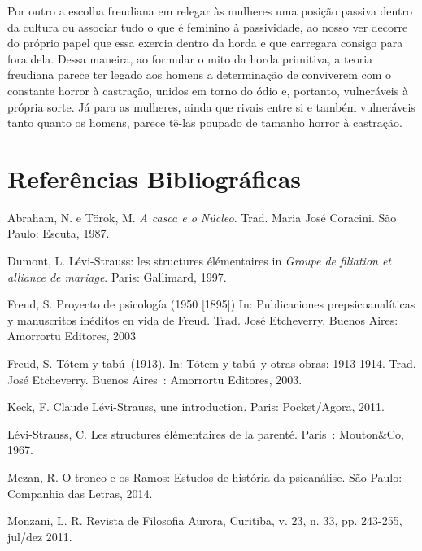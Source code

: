 Por outro a escolha freudiana em relegar às mulheres uma posição passiva
dentro da cultura ou associar tudo o que é feminino à passividade, ao
nosso ver decorre do próprio papel que essa exercia dentro da horda e
que carregara consigo para fora dela. Dessa maneira, ao formular o mito
da horda primitiva, a teoria freudiana parece ter legado aos homens a
determinação de conviverem com o constante horror à castração, unidos em
torno do ódio e, portanto, vulneráveis à própria sorte. Já para as
mulheres, ainda que rivais entre si e também vulneráveis tanto quanto os
homens, parece tê-las poupado de tamanho horror à castração.

\section{Referências Bibliográficas}

Abraham, N. e Törok, M. \emph{A casca e o Núcleo}. Trad. Maria José
Coracini. São Paulo: Escuta, 1987.

Dumont, L. Lévi-Strauss: les structures élémentaires in \emph{Groupe de
filiation et alliance de mariage}. Paris: Gallimard, 1997.

Freud, S. Proyecto de psicología (1950 {[}1895{]}) In: Publicaciones
prepsicoanalíticas y manuscritos inéditos en vida de Freud. Trad. José
Etcheverry. Buenos Aires: Amorrortu Editores, 2003

Freud, S. Tótem y tabú~(1913). In: Tótem y tabú~y otras obras:
1913-1914. Trad. José Etcheverry. Buenos Aires~: Amorrortu Editores,
2003.

Keck, F. Claude Lévi-Strauss, une introduction\emph{.} Paris:
Pocket/Agora, 2011.

Lévi-Strauss, C. Les structures élémentaires de la parenté. Paris~:
Mouton\&Co, 1967.

Mezan, R. O tronco e os Ramos: Estudos de história da psicanálise. São
Paulo: Companhia das Letras, 2014.

Monzani, L. R. Revista de Filosofia Aurora, Curitiba, v. 23, n. 33, pp.
243-255, jul/dez 2011.
